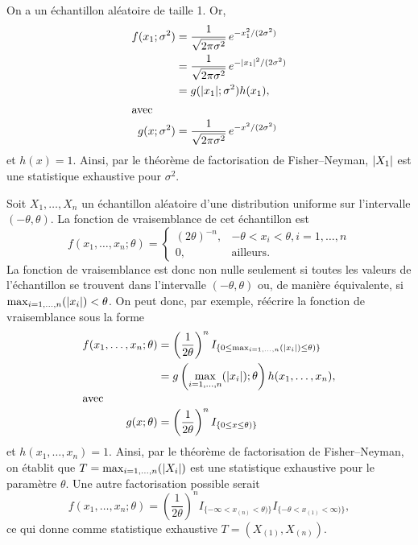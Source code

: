 \begin{solution}{3.11}
    On a un échantillon aléatoire de taille 1. Or,
    \begin{align*}
      f(x_1; \sigma^2)
      &= \frac{1}{\sqrt{2\pi \sigma^2}}\, e^{-x_1^2/(2 \sigma^2)} \\
      &= \frac{1}{\sqrt{2\pi\sigma^2}}\, e^{-\lvert x_1 \rvert^2/(2 \sigma^2)} \\
      &= g(\lvert x_1 \rvert; \sigma^2) h(x_1), \\
      \intertext{avec}
      g(x; \sigma^2)
      &= \frac{1}{\sqrt{2\pi\sigma^2}}\, e^{-x^2/(2 \sigma^2)}
    \end{align*}
    et $h(x) = 1$. Ainsi, par le théorème de factorisation de Fisher--Neyman,
    $\lvert X_1 \rvert$ est une statistique exhaustive pour $\sigma^2$.
  
\end{solution}
\begin{solution}{3.12}
    Soit $X_1, \dots, X_n$ un échantillon aléatoire d'une distribution
    uniforme sur l'intervalle $(-\theta, \theta)$. La fonction de
    vraisemblance de cet échantillon est
    \begin{equation*}
      f(x_1, \dots, x_n; \theta) =
      \begin{cases}
        (2 \theta)^{-n}, & -\theta < x_i < \theta, i = 1, \dots, n \\
        0, & \text{ailleurs}.
      \end{cases}
    \end{equation*}
    La fonction de vraisemblance est donc non nulle seulement si
    toutes les valeurs de l'échantillon se trouvent dans l'intervalle
    $(-\theta, \theta)$ ou, de manière équivalente, si $\max_{i = 1,
      \dots, n} (\lvert x_i \rvert) < \theta$. On peut donc, par exemple,
    réécrire la fonction de vraisemblance sous la forme
    \begin{align*}
      f(x_1, \dots, x_n; \theta)
      &= \left( \frac{1}{2\theta} \right)^n
      I_{\{0 \leq \max_{i = 1, \dots, n}(\lvert x_i \rvert) \leq \theta)\}} \\
      &= g \left( \max_{i = 1, \dots, n}(\lvert x_i \rvert); \theta \right)
      h(x_1, \dots, x_n), \\
      \intertext{avec}
      g(x; \theta)
      &= \left( \frac{1}{2\theta} \right)^n
      I_{\{0 \leq x \leq \theta)\}}
    \end{align*}
    et $h(x_1, \dots, x_n) = 1$. Ainsi, par le théorème de
    factorisation de Fisher--Neyman, on établit que $T = \max_{i = 1, \dots,
      n}(\lvert X_i \rvert)$ est une statistique exhaustive pour le paramètre
    $\theta$. Une autre factorisation possible serait
    \begin{equation*}
      f(x_1, \dots, x_n; \theta) =
      \left( \frac{1}{2\theta} \right)^n
      I_{\{-\infty < x_{(n)} < \theta)\}}
      I_{\{-\theta < x_{(1)} < \infty)\}},
    \end{equation*}
    ce qui donne comme statistique exhaustive $T = (X_{(1)}, X_{(n)})$.
  
\end{solution}
